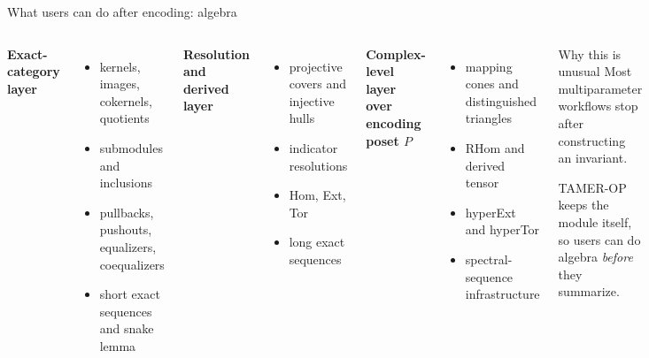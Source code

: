 \documentclass[aspectratio=169,11pt]{beamer}
\newcommand{\TAMER}{\textsc{TAMER-OP}}
\begin{document}
\begin{frame}{What users can do after encoding: algebra}
\small
\begin{columns}[T,totalwidth=\textwidth]
\textbf{Exact-category layer}
\begin{itemize}
  \item kernels, images, cokernels, quotients
  \item submodules and inclusions
  \item pullbacks, pushouts, equalizers, coequalizers
  \item short exact sequences and snake lemma
\end{itemize}

\textbf{Resolution and derived layer}
\begin{itemize}
  \item projective covers and injective hulls
  \item indicator resolutions
  \item Hom, Ext, Tor
  \item long exact sequences
\end{itemize}

\textbf{Complex-level layer over encoding poset $P$}%
\begin{itemize}
  \item mapping cones and distinguished triangles
  \item RHom and derived tensor
  \item hyperExt and hyperTor
  \item spectral-sequence infrastructure
\end{itemize}

\medskip
\begin{block}{Why this is unusual}
Most multiparameter workflows stop after constructing an invariant.

\medskip
\TAMER{} keeps the module itself, so users can do algebra \emph{before} they summarize.
\end{block}
\end{columns}
\end{frame}
\end{document}
